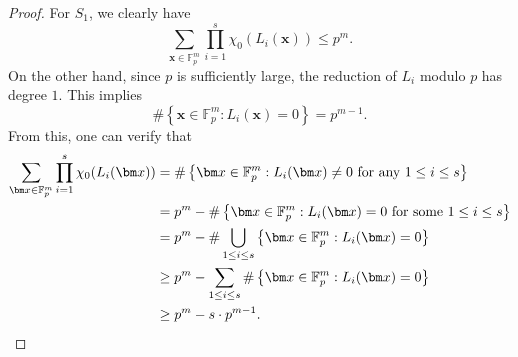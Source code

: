 \documentclass[12pt]{amsart}
\def\x{{\bm x}}
\theoremstyle{plain}
\theoremstyle{remark}
\begin{document}
\begin{proof}
		
		For $S_1$, we clearly have 
		\begin{equation}\label{Eq. upper bound for trivial}
			\sum_{\x\in\mathbb{F}_p^m}\prod_{i=1}^{s}\chi_0(L_i(\x))\le p^m.
		\end{equation}
		On the other hand, since $p$ is sufficiently large, the reduction of $L_i$ modulo $p$ has degree $1$. This implies 
		$$\#\left\{\x\in\mathbb{F}_p^m: L_i(\x)=0\right\}=p^{m-1}.$$
		From this, one can verify that 
		\begin{align}\label{Eq. lower bound for trivial}
			\sum_{\x\in\mathbb{F}_p^m}\prod_{i=1}^{s}\chi_0(L_i(\x))
&=\#\left\{\x\in\mathbb{F}_p^m: L_i(\x)\neq 0\ \text{for any $1\le i\le s$}\right\}\notag\\
&=p^m-\#\left\{\x\in\mathbb{F}_p^m: L_i(\x)=0\ \text{for some $1\le i\le s$}\right\}\notag\\
&=p^m-\#\bigcup_{1\le i\le s}\left\{\x\in\mathbb{F}_p^m: L_i(\x)=0\right\}\notag\\
&\ge p^m-\sum_{1\le i\le s}\#\left\{\x\in\mathbb{F}_p^m: L_i(\x)=0\right\}\notag\\
&\ge p^m-s\cdot p^{m-1}.
		\end{align}
		

\end{proof}
\end{document}
